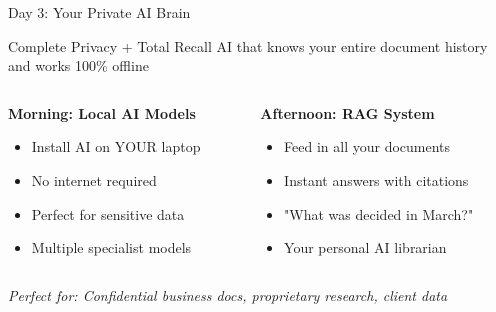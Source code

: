 \documentclass{beamer}
\begin{document}
\begin{frame}{Day 3: Your Private AI Brain}
\begin{alertblock}{Complete Privacy + Total Recall}
AI that knows your entire document history and works 100\% offline
\end{alertblock}
\vspace{0.5em}
\begin{columns}[T]
\begin{column}{0.5\textwidth}
\textbf{Morning: Local AI Models}
\begin{itemize}
\item Install AI on YOUR laptop
\item No internet required
\item Perfect for sensitive data
\item Multiple specialist models
\end{itemize}
\end{column}
\begin{column}{0.5\textwidth}
\textbf{Afternoon: RAG System}
\begin{itemize}
\item Feed in all your documents
\item Instant answers with citations
\item "What was decided in March?"
\item Your personal AI librarian
\end{itemize}
\end{column}
\end{columns}
\vspace{0.5em}
\begin{center}
\small{\textit{Perfect for: Confidential business docs, proprietary research, client data}}
\end{center}
\end{frame}
\end{document}
